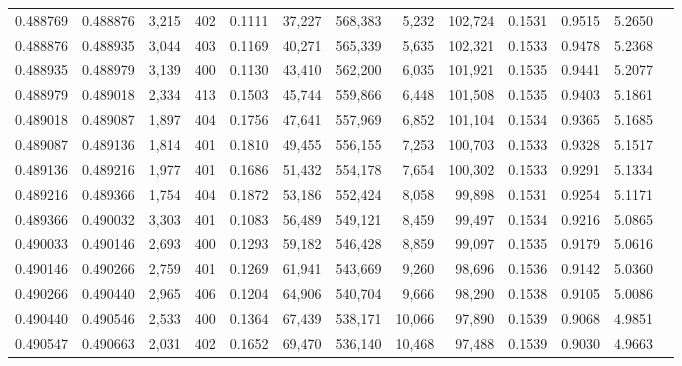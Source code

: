 \begin{tabular}{rrrrrrrrrrrrr}
0.488769 & 0.488876 & 3,215 & 402 &                                     0.1111 &  37,227 & 568,383 &   5,232 & 102,724 & 0.1531 & 0.9515 & 5.2650 \\
0.488876 & 0.488935 & 3,044 & 403 &                                     0.1169 &  40,271 & 565,339 &   5,635 & 102,321 & 0.1533 & 0.9478 & 5.2368 \\
0.488935 & 0.488979 & 3,139 & 400 &                                     0.1130 &  43,410 & 562,200 &   6,035 & 101,921 & 0.1535 & 0.9441 & 5.2077 \\
0.488979 & 0.489018 & 2,334 & 413 &                                     0.1503 &  45,744 & 559,866 &   6,448 & 101,508 & 0.1535 & 0.9403 & 5.1861 \\
0.489018 & 0.489087 & 1,897 & 404 &                                     0.1756 &  47,641 & 557,969 &   6,852 & 101,104 & 0.1534 & 0.9365 & 5.1685 \\
0.489087 & 0.489136 & 1,814 & 401 &                                     0.1810 &  49,455 & 556,155 &   7,253 & 100,703 & 0.1533 & 0.9328 & 5.1517 \\
0.489136 & 0.489216 & 1,977 & 401 &                                     0.1686 &  51,432 & 554,178 &   7,654 & 100,302 & 0.1533 & 0.9291 & 5.1334 \\
0.489216 & 0.489366 & 1,754 & 404 &                                     0.1872 &  53,186 & 552,424 &   8,058 &  99,898 & 0.1531 & 0.9254 & 5.1171 \\
0.489366 & 0.490032 & 3,303 & 401 &                                     0.1083 &  56,489 & 549,121 &   8,459 &  99,497 & 0.1534 & 0.9216 & 5.0865 \\
0.490033 & 0.490146 & 2,693 & 400 &                                     0.1293 &  59,182 & 546,428 &   8,859 &  99,097 & 0.1535 & 0.9179 & 5.0616 \\
0.490146 & 0.490266 & 2,759 & 401 &                                     0.1269 &  61,941 & 543,669 &   9,260 &  98,696 & 0.1536 & 0.9142 & 5.0360 \\
0.490266 & 0.490440 & 2,965 & 406 &                                     0.1204 &  64,906 & 540,704 &   9,666 &  98,290 & 0.1538 & 0.9105 & 5.0086 \\
0.490440 & 0.490546 & 2,533 & 400 &                                     0.1364 &  67,439 & 538,171 &  10,066 &  97,890 & 0.1539 & 0.9068 & 4.9851 \\
0.490547 & 0.490663 & 2,031 & 402 &                                     0.1652 &  69,470 & 536,140 &  10,468 &  97,488 & 0.1539 & 0.9030 & 4.9663 \\

\end{tabular}
